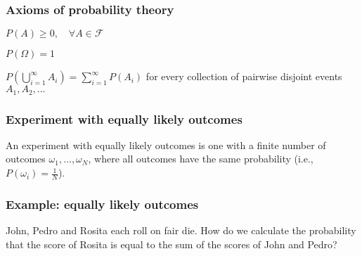 \begin{frame}
\frametitle{Axioms of probability theory}


    \begin{probAxiom}

        $P(A)\ge 0,\quad\forall A\in\mathcal{F}$

    \end{probAxiom}

    \begin{probAxiom}

        $P(\Omega)=1$

    \end{probAxiom}

    \begin{probAxiom}

        $P\left(\bigcup_{i=1}^\infty A_i\right)=\sum_{i=1}^\infty P(A_i)$ for every collection of pairwise disjoint events $A_1,A_2,\ldots$

    \end{probAxiom}



\end{frame}

\begin{frame}
    \frametitle{Experiment with equally likely outcomes}

    An experiment with equally likely outcomes is one with a finite number of
    outcomes $\omega_1,\ldots,\omega_N$, where all outcomes have the same
    probability (i.e., $P(\omega_i)=\frac{1}{N}$).


\end{frame}

\begin{frame}
    \frametitle{Example: equally likely outcomes}

    \begin{probExample}
        John, Pedro and Rosita each roll on fair die. How do we calculate the
        probability that the score of Rosita is equal to the sum of the scores
        of John and Pedro?
    \end{probExample}


\end{frame}

